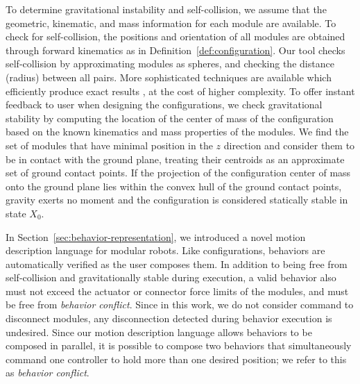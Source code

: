 \documentclass[graybox]{svmult}
\begin{document}
To determine gravitational instability and
self-collision, we assume that the geometric, kinematic, and mass
information for each module are available. 
%
To check for self-collision, the positions and orientation of all modules are
obtained  through forward kinematics as in Definition~\ref{def:configuration}.
Our tool checks self-collision by
approximating modules as spheres, and checking the distance (radius) between all
pairs. More sophisticated techniques are available which efficiently produce
exact results \cite{pan2012fcl}, at the cost of higher complexity.
%
To offer instant feedback to user when designing the configurations, we
 check gravitational stability by computing the location of the center of
mass of the configuration based on the known kinematics and mass properties of 
the modules.
%
We find the set of modules that have minimal position in the $z$ direction and consider them to
be in contact with the ground plane, treating their centroids as an approximate
set of ground contact points.
If the projection of the configuration center of mass onto the ground plane
lies within the convex hull of the ground contact points, gravity exerts no
moment and the configuration
is considered statically stable in state \(X_0\).

In Section~\ref{sec:behavior-representation}, we introduced a novel motion description language for modular robots. Like
configurations, behaviors are automatically verified as the user composes them.
  In addition to being free from self-collision and gravitationally stable during
execution, a valid behavior also must not exceed the actuator or connector force
limits of the modules, and must be free from \textit{behavior conflict}.
Since in this work, we do not consider command to disconnect modules, any disconnection detected during behavior execution is undesired.
Since our motion description language allows behaviors to be composed in parallel,
it is possible to compose two behaviors that simultaneously command one controller
to hold more than one desired position; we refer to this as \textit{behavior
conflict}.
\end{document}
